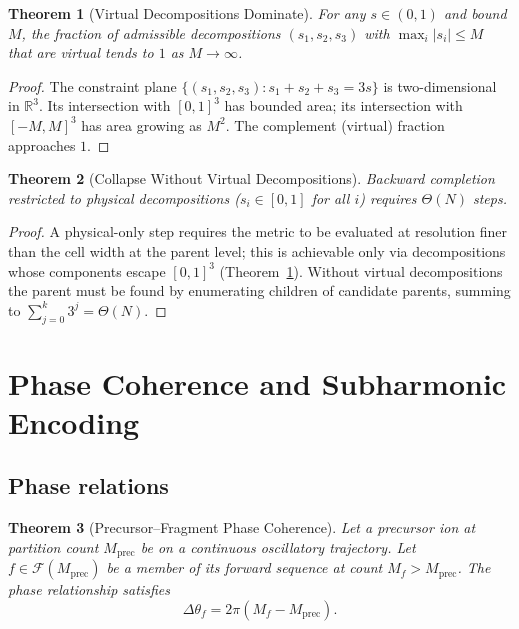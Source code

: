 \documentclass[twocolumn,10pt,a4paper]{article}
\theoremstyle{thmstyle}
\newtheorem{theorem}{Theorem}[section]
\theoremstyle{definition}
\theoremstyle{remark}
\newcommand{\R}{\mathbb{R}}
\newcommand{\calF}{\mathcal{F}}
\begin{document}
\begin{theorem}[Virtual Decompositions Dominate]
\label{thm:virt}
For any $s\in(0,1)$ and bound $M$, the fraction of admissible
decompositions $(s_{1},s_{2},s_{3})$ with $\max_{i}|s_{i}|\leq M$
that are virtual tends to $1$ as $M\to\infty$.
\end{theorem}

\begin{proof}
The constraint plane $\{(s_{1},s_{2},s_{3}):s_{1}+s_{2}+s_{3}=3s\}$
is two-dimensional in $\R^{3}$. Its intersection with $[0,1]^{3}$ has
bounded area; its intersection with $[-M,M]^{3}$ has area growing as
$M^{2}$. The complement (virtual) fraction approaches $1$.
\end{proof}

\begin{theorem}[Collapse Without Virtual Decompositions]
\label{thm:collapse}
Backward completion restricted to physical decompositions
($s_{i}\in[0,1]$ for all $i$) requires $\Theta(N)$ steps.
\end{theorem}

\begin{proof}
A physical-only step requires the metric to be evaluated at resolution
finer than the cell width at the parent level; this is achievable only
via decompositions whose components escape $[0,1]^{3}$
(Theorem~\ref{thm:virt}). Without virtual decompositions the parent
must be found by enumerating children of candidate parents, summing
to $\sum_{j=0}^{k}3^{j}=\Theta(N)$.
\end{proof}

\section{Phase Coherence and Subharmonic Encoding}
\label{sec:phase}

\subsection{Phase relations}

\begin{theorem}[Precursor--Fragment Phase Coherence]
\label{thm:coh}
Let a precursor ion at partition count $M_{\mathrm{prec}}$ be on a
continuous oscillatory trajectory. Let $f\in\calF(M_{\mathrm{prec}})$
be a member of its forward sequence at count
$M_{f}>M_{\mathrm{prec}}$. The phase relationship satisfies
\begin{equation}
\boxed{\;\Delta\theta_{f}=2\pi(M_{f}-M_{\mathrm{prec}}).\;}
\label{eq:dtheta}
\end{equation}
\end{theorem}
\end{document}
